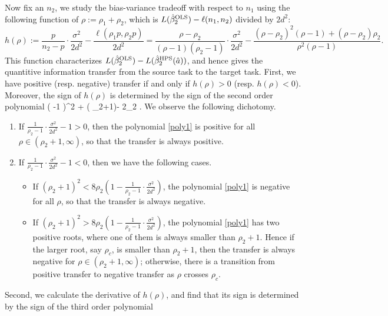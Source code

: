 Now fix an $n_2$, we study the bias-variance tradeoff with respect to $n_1$ using the following function of $\rho:=\rho_1+\rho_2$, which is $L(\hat{\beta}_2^{\textup{OLS}} )-\ell(n_1,n_2)$ divided by $2d^2$:
$$h(\rho):=\frac{p }{n_2-p}\cdot \frac{\sigma^2}{2d^2}- \frac{\ell(\rho_1p , \rho_2p)}{2d^2}  = \frac{\rho-\rho_2}{(\rho-1)(\rho_2-1)}\cdot \frac{\sigma^2}{2d^2}- \frac{(\rho-\rho_2)^2 (\rho-1)+(\rho-\rho_2)\rho_2}{\rho^2(\rho-1)}  .$$
This function characterizes $L(\hat{\beta}_2^{\textup{OLS}} )-L(\hat{\beta}_2^{\textup{HPS}}(\hat a)) $, and hence gives the quantitive information transfer from the source task to the target task.
First, we have positive (resp. negative) transfer if and only if $h(\rho)>0$ (resp. $h(\rho)<0$). Moreover, the sign of $h(\rho)$ is determined by the sign of the second order polynomial %
\be\label{poly1} \left( \cdot {}-1 \right)\rho^2 + ( \rho_2+1)\rho - 2\rho_2 .\ee
We observe the following dichotomy. %
\begin{enumerate}
\item If $\frac{1}{\rho_2-1}\cdot \frac{\sigma^2}{2d^2}-1 >0$, then the polynomial \eqref{poly1} is positive for all $\rho\in (\rho_2+1,\infty)$, so that the transfer is always positive.

\item If $\frac{1}{\rho_2-1}\cdot \frac{\sigma^2}{2d^2}-1 < 0$, then we have the following cases.

\begin{itemize}
\item If $(\rho_2+1)^2 < 8\rho_2 \left( 1- \frac{1}{\rho_2-1}\cdot \frac{\sigma^2}{2d^2}  \right)$, the polynomial \eqref{poly1} is negative for all $\rho$, so that the transfer is always negative.

\item If $(\rho_2+1)^2 > 8\rho_2 \left( 1- \frac{1}{\rho_2-1}\cdot \frac{\sigma^2}{2d^2}  \right)$, the polynomial \eqref{poly1} has two positive roots, where one of them is always smaller than $\rho_2+1$. Hence if the larger root, say $\rho_c$, is smaller than $\rho_2+1$, then the transfer is always negative for $\rho\in (\rho_2+1,\infty)$; otherwise, there is a transition from positive transfer to negative transfer as $\rho$ crosses $\rho_c$.
\end{itemize}
\end{enumerate}
Second, we calculate the derivative of $h(\rho)$, and find that its sign  is determined by the sign of the third order polynomial
